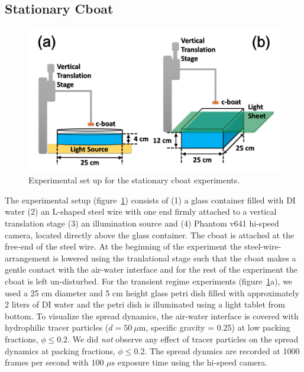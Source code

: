 \documentclass[journal=langd5, manuscript=article, layout=twocolumn]{achemso}
\begin{document}
\subsection{Stationary Cboat}
\begin{figure}[ht]
    \begin{center}
       \includegraphics[scale=0.25]{figure1.png}
    \end{center}
    \caption{Experimental set up for the stationary cboat experiments.}
    \label{fig:expsetup}
\end{figure}
The experimental setup (figure~\ref{fig:expsetup}) consists of (1) a glass container filled with DI water (2) an L-shaped steel wire with one end firmly attached to a vertical translation stage (3) an illumination source and (4) Phantom v641 hi-speed camera, located directly above the glass container. The cboat is attached at the free-end of the steel wire. At the beginning of the experiment the steel-wire-arrangement is lowered using the tranlational stage such that the cboat makes a gentle contact with the air-water interface and for the rest of the experiment the cboat is left un-disturbed. For the transient regime experiments (figure~\ref{fig:expsetup}a), we used a 25 $\mathrm{cm}$ diameter and 5 $\mathrm{cm}$ height glass petri dish filled with approximately 2 liters of DI water and the petri dish is illuminated using a light tablet from bottom. To visualize the spread dynamics, the air-water interface is covered with hydrophilic tracer particles ($d = 50\ \mu \mathrm{m}$, specific gravity = 0.25) at low packing fractions, $\phi \leq 0.2$. We did \emph{not} observe any effect of tracer particles on the spread dynamics at packing fractions, $\phi \leq 0.2$. The spread dynmics are recorded at 1000 frames per second with 100 $\mu \mathrm{s}$ exposure time using the hi-speed camera. 
\end{document}
